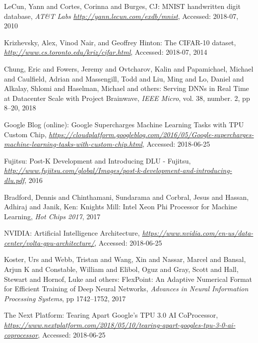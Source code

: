 \documentclass[techrep,english]{ipsj} %
\begin{document}
\begin{thebibliography}{99}

  LeCun, Yann and Cortes, Corinna and Burges, CJ:
  MNIST handwritten digit database,
  {\it AT\&T Labs \url{http://yann.lecun.com/exdb/mnist}},
  Accessed: 2018-07, 2010

  Krizhevsky, Alex, Vinod Nair, and Geoffrey Hinton:
  The CIFAR-10 dataset,
  {\it \url{http://www.cs.toronto.edu/kriz/cifar.html}},
  Accessed: 2018-07, 2014

  Chung, Eric and Fowers, Jeremy and Ovtcharov, Kalin and Papamichael, Michael and Caulfield, Adrian and Massengill, Todd and Liu, Ming and Lo, Daniel and Alkalay, Shlomi and Haselman, Michael and others:
  Serving DNNs in Real Time at Datacenter Scale with Project Brainwave,
  {\it IEEE Micro},
  vol. 38, number. 2, pp 8--20, 2018

  Google Blog (online):
  Google Supercharges Machine Learning Tasks with TPU Custom Chip,
  {\it \url{https://cloudplatform.googleblog.com/2016/05/Google-supercharges-machine-learning-tasks-with-custom-chip.html}},
  Accessed: 2018-06-25

  Fujitsu:
  Post-K Development and Introducing DLU - Fujitsu,
  {\it \url{http://www.fujitsu.com/global/Images/post-k-development-and-introducing-dlu.pdf}},
  2016

  Bradford, Dennis and Chinthamani, Sundarama and Corbral, Jesus and Hassan, Adhiraj and Janik, Ken:
  Knights Mill: Intel Xeon Phi Processor for Machine Learning,
  {\it Hot Chips 2017},
  2017
  
  NVIDIA:
  Artificial Intelligence Architecture,
  {\it \url{https://www.nvidia.com/en-us/data-center/volta-gpu-architecture/}},
  Accessed: 2018-06-25

  Koster, Urs and Webb, Tristan and Wang, Xin and Nassar, Marcel and Bansal, Arjun K and Constable, William and Elibol, Oguz and Gray, Scott and Hall, Stewart and Hornof, Luke and others:
  FlexPoint: An Adaptive Numerical Format for Efficient Training of Deep Neural Networks,
  {\it Advances in Neural Information Processing Systems},
  pp 1742--1752, 2017

  The Next Platform:
  Tearing Apart Google’s TPU 3.0 AI CoProcessor,
  {\it \url{https://www.nextplatform.com/2018/05/10/tearing-apart-googles-tpu-3-0-ai-coprocessor}},
  Accessed: 2018-06-25
    

\end{thebibliography}
\end{document}
